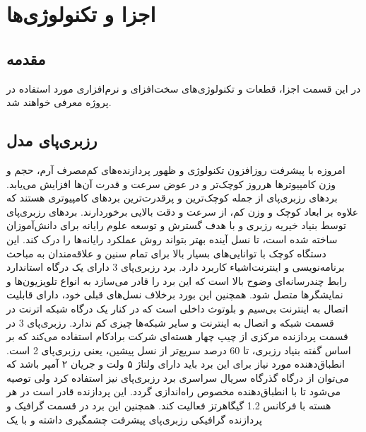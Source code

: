 \chapter{اجزا و تکنولوژی‌ها}

\section{مقدمه}
در این قسمت اجزا، قطعات و تکنولوژی‌های سخت‌افزای و نرم‌افزاری مورد استفاده در پروژه معرفی خواهند شد.

\section{رزبری‌پای مدل }
امروزه با پیشرفت روزافزون تکنولوژی و ظهور پردازنده‌های کم‌مصرف آرم، حجم و وزن کامپیوترها هرروز کوچک‌تر و در عوض سرعت و قدرت آن‌ها افزایش می‌یابد. بردهای رزبری‌پای\cite{Raspberry}  از جمله کوچک‌ترین و پرقدرت‌ترین بردهای کامپیوتری هستند که علاوه بر ابعاد کوچک و وزن کم، از سرعت و دقت بالایی برخوردارند. بردهای رزبری‌پای توسط بنیاد خیریه رزبری  و با هدف گسترش و توسعه علوم رایانه برای دانش‌آموزان ساخته شده است، تا نسل آینده بهتر بتواند روش عملکرد رایانه‌ها را درک کند. این دستگاه کوچک با توانایی‌های بسیار بالا برای تمام سنین و علاقه‌مندان به مباحث برنامه‌نویسی و اینترنت‌اشیاء کاربرد دارد. برد رزبری‌پای 3 دارای یک درگاه استاندارد رابط چندرسانه‌ای وضوح بالا است که این برد را قادر می‌سازد به انواع تلویزیون‌ها و نمایشگرها متصل شود. همچنین این بورد برخلاف نسل‌های قبلی خود، دارای قابلیت اتصال به اینترنت بی‌سیم و بلوتوث داخلی است که در کنار یک درگاه شبکه اترنت در قسمت شبکه و اتصال به اینترنت و سایر شبکه‌ها چیزی کم ندارد. رزبری‌پای 3 در قسمت پردازنده مرکزی از چیپ چهار هسته‌ای  شرکت برادکام استفاده می‌کند که بر اساس گفته بنیاد رزبری، تا 60 درصد سریع‌تر از نسل پیشین، یعنی رزبری‌پای 2 است. انطباق‌دهنده مورد نیاز برای این برد باید دارای ولتاژ ۵ ولت و جریان ۲ آمپر باشد که می‌توان از درگاه گذرگاه سریال سراسری  برد رزبری‌پای نیز استفاده کرد ولی توصیه می‌شود تا با انطباق‌دهنده مخصوص راه‌اندازی گردد. این پردازنده قادر است در هر هسته با فرکانس 1.2 گیگاهرتز فعالیت کند. همچنین این برد در قسمت گرافیک و پردازنده گرافیکی رزبری‌پای پیشرفت چشمگیری داشته و با یک 

